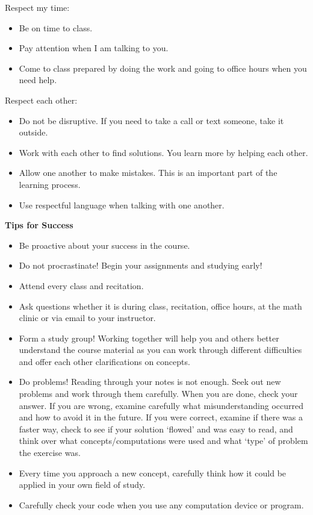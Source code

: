 \documentclass[11pt,letterpaper]{article}
\newcommand{\lefthead}[2]{\noindent\textbf{#1}\hfill\\[#2]}
\begin{document}
\noindent Respect my time:
\begin{itemize}
\item Be on time to class.
\item Pay attention when I am talking to you.
\item Come to class prepared by doing the work and going to office hours when you need help.
\end{itemize}

\noindent Respect each other:
\begin{itemize}
\item Do not be disruptive. If you need to take a call or text someone, take it outside.
\item Work with each other to find solutions. You learn more by helping each other.
\item Allow one another to make mistakes. This is an important part of the learning process.
\item Use respectful language when talking with one another.
\end{itemize} \vspace{0.3cm}

\lefthead{Tips for Success}{0cm}
	\begin{itemize}
	\item Be proactive about your success in the course.
	\item Do not procrastinate! Begin your assignments and studying early!
	\item Attend every class and recitation.
	\item Ask questions whether it is during class, recitation, office hours, at the math clinic or via email to your instructor.
	\item Form a study group! Working together will help you and others better understand the course material as you can work through different difficulties and offer each other clarifications on concepts. 
	\item Do problems! Reading through your notes is not enough. Seek out new problems and work through them carefully. When you are done, check your answer. If you are wrong, examine carefully what misunderstanding occurred and how to avoid it in the future. If you were correct, examine if there was a faster way, check to see if your solution `flowed' and was easy to read, and think over what concepts/computations were used and what `type' of problem the exercise was. 
	\item Every time you approach a new concept, carefully think how it could be applied in your own field of study.
	\item Carefully check your code when you use any computation device or program. \\
	\end{itemize}
	
\end{document}
